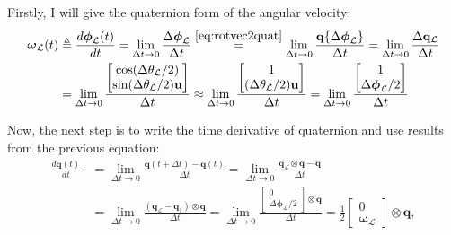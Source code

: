 Firstly, I will give the quaternion form of the angular velocity:
\begin{equation}
\begin{aligned}
    \boldsymbol{\omega}_\mathcal{L}(t)&\triangleq\frac{d\boldsymbol{\phi}_\mathcal{L}(t)}{dt}=\lim_{\Delta t\rightarrow 0}\frac{\Delta\boldsymbol{\phi}_\mathcal{L}}{\Delta t} \stackrel{\eqref{eq:rotvec2quat}}{=}\lim_{\Delta t\rightarrow 0}\frac{\mathbf{q}\{\Delta\boldsymbol{\phi}_\mathcal{L}\}}{\Delta t}=\lim_{\Delta t\rightarrow 0}\frac{\Delta\mathbf{q}_\mathcal{L}}{\Delta t}\\
    &=\lim_{\Delta t\rightarrow 0}\frac{\begin{bmatrix} \cos(\Delta\theta_\mathcal{L}/2) \\ \sin(\Delta\theta_\mathcal{L}/2)\mathbf{u}
    \end{bmatrix}}{\Delta t}\approx\lim_{\Delta t\rightarrow 0}\frac{\begin{bmatrix} 1 \\ (\Delta\theta_\mathcal{L}/2)\mathbf{u}
    \end{bmatrix}}{\Delta t}=\lim_{\Delta t\rightarrow 0}\frac{\begin{bmatrix} 1 \\ \Delta\boldsymbol{\phi}_\mathcal{L}/2
    \end{bmatrix}}{\Delta t}
\end{aligned}
\end{equation}

Now, the next step is to write the time derivative of quaternion and use results from the previous equation:
\begin{equation}
\begin{aligned}
    \frac{d\mathbf{q}(t)}{dt}&=\lim_{\Delta t\rightarrow 0}\frac{\mathbf{q}(t+\Delta t)-\mathbf{q}(t)}{\Delta t}=\lim_{\Delta t\rightarrow 0}\frac{\mathbf{q}_\mathcal{L} \otimes \mathbf{q}-\mathbf{q}}{\Delta t} \\ &=
    \lim_{\Delta t\rightarrow 0}\frac{(\mathbf{q}_\mathcal{L}-\mathbf{q}_1)\otimes\mathbf{q}}{\Delta t}=\lim_{\Delta t\rightarrow 0}\frac{\begin{bmatrix}
        0 \\ \Delta\boldsymbol{\phi}_\mathcal{L}/2
    \end{bmatrix} \otimes \mathbf{q}}{\Delta t}=\frac{1}{2}\begin{bmatrix}
        0 \\ \boldsymbol{\omega}_\mathcal{L}
    \end{bmatrix}\otimes\mathbf{q},
\end{aligned}
\label{eq:quat-derivative}
\end{equation}

